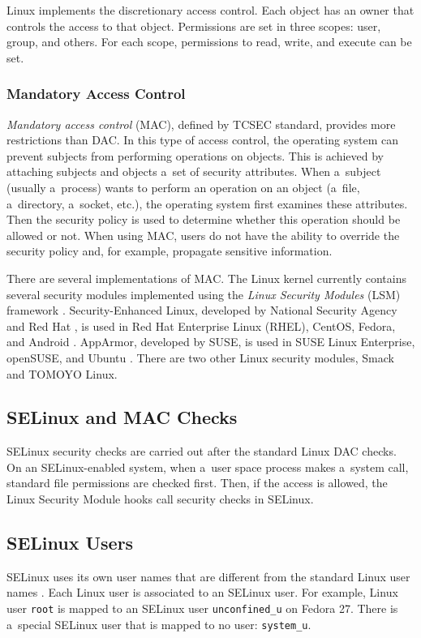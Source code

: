 Linux implements the discretionary access control. Each object has an owner
that controls the access to that object. Permissions are set in three scopes:
user, group, and others. For each scope, permissions to read, write, and execute
can be set.

\subsubsection{Mandatory Access Control}
\emph{Mandatory access control} (MAC), defined by TCSEC standard, provides more
restrictions than DAC. In this type of access control, the operating system can
prevent subjects from performing operations on objects. This is achieved by
attaching subjects and objects a~set of security attributes. When a~subject
(usually a~process) wants to perform an operation on an object (a~file,
a~directory, a~socket, etc.), the operating system first examines these
attributes. Then the security policy is used to determine whether this operation
should be allowed or not. When using MAC, users do not have the ability to
override the security policy and, for example, propagate sensitive information.

There are several implementations of MAC. The Linux kernel currently contains
several security modules implemented using the \emph{Linux Security Modules}
(LSM) framework \cite{lsmusage}. Security-Enhanced Linux, developed by National
Security Agency and Red Hat \cite{selinuxcontr}, is used in Red Hat Enterprise
Linux (RHEL), CentOS, Fedora, and Android
\cite{selinuxguide,selinuxguidefedora,selinuxandroid}. AppArmor, developed by
SUSE, is used in SUSE Linux Enterprise, openSUSE, and Ubuntu
\cite{apparmor,apparmorubuntu}. There are two other Linux security modules,
Smack and TOMOYO Linux.

\subsection{SELinux and MAC Checks}
SELinux security checks are carried out after the standard Linux DAC checks.
On an SELinux-enabled system, when a~user space process makes a~system
call, standard file permissions are checked first. Then, if the access is
allowed, the Linux Security Module hooks call security checks in SELinux.

\subsection{SELinux Users}
\label{selinuxuser}
SELinux uses its own user names that are different from the standard Linux user
names \cite[p.~24]{tsn}. Each Linux user is associated to an SELinux user. For
example, Linux user \texttt{root} is mapped to an SELinux user
\texttt{unconfined\_u} on Fedora 27. There is a~special SELinux user that is
mapped to no user: \texttt{system\_u}.

